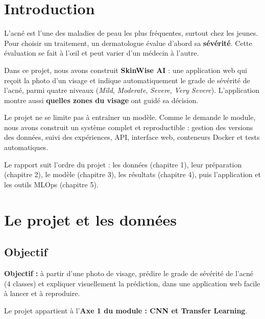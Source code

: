 \documentclass[11pt,a4paper]{report}
\begin{document}
\chapter*{Introduction}

L'acné est l'une des maladies de peau les plus fréquentes, surtout chez les jeunes. Pour
choisir un traitement, un dermatologue évalue d'abord sa \textbf{sévérité}. Cette évaluation
se fait à l'œil et peut varier d'un médecin à l'autre.

\medskip
Dans ce projet, nous avons construit \textbf{SkinWise AI} : une application web qui reçoit
la photo d'un visage et indique automatiquement le grade de sévérité de l'acné, parmi
quatre niveaux (\textit{Mild}, \textit{Moderate}, \textit{Severe}, \textit{Very Severe}).
L'application montre aussi \textbf{quelles zones du visage} ont guidé sa décision.

\medskip
Le projet ne se limite pas à entraîner un modèle. Comme le demande le module, nous avons
construit un système complet et reproductible : gestion des versions des données,
suivi des expériences, API, interface web, conteneurs Docker et tests automatiques.

\medskip
Le rapport suit l'ordre du projet : les données (chapitre 1), leur préparation
(chapitre 2), le modèle (chapitre 3), les résultats (chapitre 4), puis l'application et
les outils MLOps (chapitre 5).

\chapter{Le projet et les données}

\section{Objectif}

\begin{mdframed}[linecolor=tekupblue,linewidth=1.5pt,roundcorner=4pt,innertopmargin=8pt,innerbottommargin=8pt]
\textbf{Objectif :} à partir d'une photo de visage, prédire le grade de sévérité de l'acné
(4 classes) et expliquer visuellement la prédiction, dans une application web facile à
lancer et à reproduire.
\end{mdframed}

Le projet appartient à l'\textbf{Axe 1 du module : CNN et Transfer Learning}.
\end{document}
